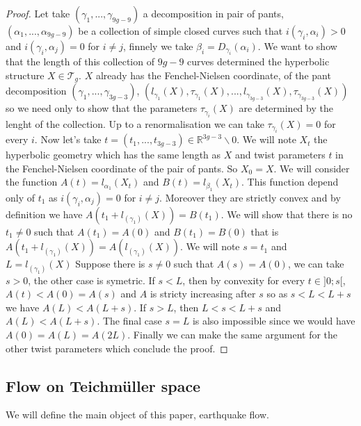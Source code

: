 \begin{proof}
Let take $(\gamma_1,...,\gamma_{9g-9})$ a decomposition in pair of pants, $(\alpha_1,...,\alpha_{9g-9})$ be a collection of simple closed curves such that $i(\gamma_i,\alpha_i) > 0$ and $i(\gamma_i,\alpha_j)=0$ for $i \neq j$, finnely we take $\beta_i=D_{\gamma_i}(\alpha_i)$. We want to show that the length of this collection of $9g-9$ curves determined the hyperbolic structure $X \in \mathcal{T}_g$.
$X$ already has the Fenchel-Nielsen coordinate, of the pant decomposition $(\gamma_1,...,\gamma_{3g-3})$, $(l_{\gamma_1}(X),\tau_{\gamma_1}(X),...,l_{\gamma_{3g-3}}(X),\tau_{\gamma_{3g-3}}(X))$ so we need only to show that the parameters $\tau_{\gamma_i}(X)$ are determined by the lenght of the collection. Up to a renormalisation we can take $\tau_{\gamma_i}(X)=0$ for every $i$. Now let's take $t=(t_1,...,t_{3g-3}) \in \mathbb{R}^{3g-3} \backslash 0$.
We will note $X_t$ the hyperbolic geometry which has the same length as $X$ and twist parameters $t$ in the Fenchel-Nielsen coordinate of the pair of pants. So $X_0 = X$. We will consider the function $A(t)=l_{\alpha_1}(X_t)$ and $B(t)=l_{\beta_1}(X_t)$. This function depend only of $t_1$ as $i(\gamma_i,\alpha_j)=0$ for $i \neq j$. Moreover they are strictly convex and by definition we have $A(t_1+l_(\gamma_1)(X))= B(t_1)$. We will show that there is no $t_1 \neq 0$ such that $A(t_1)=A(0)$ and $B(t_1)=B(0)$ that is $A(t_1+l_(\gamma_1)(X))=A(l_(\gamma_1)(X))$. We will note $s=t_1$ and $L=l_(\gamma_1)(X)$
Suppose there is $s \neq 0$ such that $A(s)=A(0)$, we can take $s > 0$, the other case is symetric. If $s < L$, then by convexity for every $t \in ]0;s[$, $A(t) < A(0)=A(s)$ and $A$ is stricty increasing after $s$ so as $s < L < L+s$ we have $A(L)< A(L+s)$.
If $s > L$, then $L < s < L+s$ and  $A(L) < A(L+s)$. The final case $s=L$ is also impossible since we would have $A(0)=A(L)=A(2L)$.
Finally we can make the same argument for the other twist parameters which conclude the proof.
\end{proof}

\subsection{Flow on Teichmüller space}

We will define the main object of this paper, earthquake flow.

